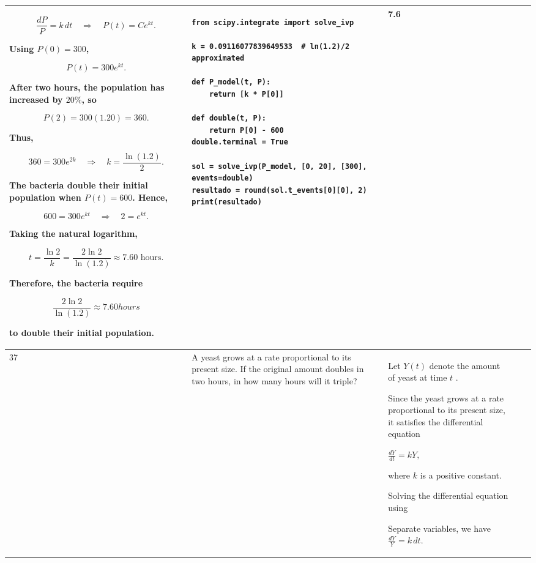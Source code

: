 \documentclass[a4paper,12pt]{article}
\begin{document}
\begin{longtable}{|p{0.3cm}|p{}|p{10cm}|p{}|p{1.5cm}|}
$$
\frac{dP}{P}=k\,dt
\quad\Longrightarrow\quad
P(t)=Ce^{kt}.
$$

Using \(P(0)=300\),

$$
P(t)=300e^{kt}.
$$

After two hours, the population has increased by \(20\%\), so

$$
P(2)=300(1.20)=360.
$$

Thus,

$$
360=300e^{2k}
\quad\Longrightarrow\quad
k=\frac{\ln(1.2)}{2}.
$$

The bacteria double their initial population when \(P(t)=600\). Hence,

$$
600=300e^{kt}
\quad\Longrightarrow\quad
2=e^{kt}.
$$

Taking the natural logarithm,

$$
t=\frac{\ln 2}{k}
=\frac{2\ln 2}{\ln(1.2)}
\approx7.60\text{ hours}.
$$

Therefore, the bacteria require

$$
\frac{2\ln 2}{\ln(1.2)}\approx7.60 hours
$$

to double their initial population.




          &\begin{verbatim}
from scipy.integrate import solve_ivp

k = 0.09116077839649533  # ln(1.2)/2 approximated

def P_model(t, P):
    return [k * P[0]]

def double(t, P):
    return P[0] - 600
double.terminal = True

sol = solve_ivp(P_model, [0, 20], [300], events=double)
resultado = round(sol.t_events[0][0], 2)
print(resultado)
\end{verbatim} &   7.6           \\ \hline
      37           &  A yeast grows at a rate proportional to its present size. If the original amount doubles in two hours, in how many hours will it triple?        &   
Let $Y(t)$ denote the amount of yeast at time $t$ .

Since the yeast grows at a rate proportional to its present size, it satisfies the differential equation

$
\frac{dY}{dt}=kY,
$

where $k$ is a positive constant.

Solving the differential equation using 

Separate  variables, we have $\frac{dY}{Y}=k\,dt.$


\end{longtable}
\end{document}
